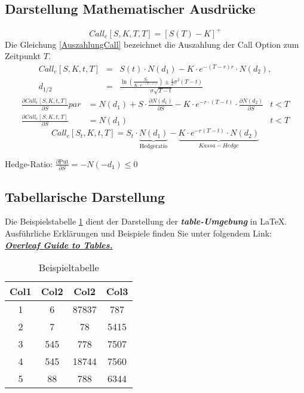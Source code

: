 \documentclass[12pt,a4paper]{article}
\begin{document}
\subsection{Darstellung Mathematischer Ausdrücke}\label{math}
\begin{equation}\label{AuszahlungCall}
Call_e[S,K,T,T]=\left[S(T)-K\right]^+
\end{equation}
Die Gleichung \eqref{AuszahlungCall} bezeichnet die Auszahlung der Call Option zum Zeitpunkt $T$.
\begin{eqnarray*}
Call_e[S,K,t,T]&=&S(t)\cdot N(d_1)-K\cdot e^{-(T-r)r}\cdot N(d_2),\\
d_{1/2}&=&\frac{\ln\left(\frac{S_t}{K\cdot e^{-(T-t)r}}\right)\pm\frac{1}{2}\sigma^2(T-t)}{\sigma\sqrt{T-t}}
\end{eqnarray*}
\begin{align}
\frac{\partial Call_e[S,K,t,T]}{\partial S}par&=N(d_1)+S\cdot\frac{\partial N(d_1)}{\partial S}-K\cdot e^{-r\cdot(T-t)}\cdot\frac{\partial N(d_2)}{\partial S}&t<T\\
\frac{\partial Call_e[S,K,t,T]}{\partial S}&=N(d_1)&t<T
\end{align}
$$Call_e[S_t,K,t,T]=S_t\cdot \underbrace{N(d_1)}_{\text{Hedgeratio}}-\underbrace{K\cdot e^{-r(T-t)}\cdot N(d_2)}_{Kassa-Hedge}$$

Hedge-Ratio: $\frac{\partial \text{Put}}{\partial S}=-N(-d_1)\leq 0$

\subsection{Tabellarische Darstellung}\label{numeric}

Die Beispielstabelle \ref{Tbsp} dient der Darstellung der \textbf{\emph{table-Umgebung}} in \LaTeX.\\
Ausführliche Erklärungen und Beispiele finden Sie unter folgendem Link:\\
\href{https://www.overleaf.com/learn/latex/tables}{\textbf{\emph {Overleaf Guide to Tables.}}}
\begin{table}[h!]
\centering
\begin{tabular}{||c c c c||} 
 \hline
 Col1 & Col2 & Col2 & Col3 \\ [0.5ex] 
 \hline\hline
 1 & 6 & 87837 & 787 \\ 
 2 & 7 & 78 & 5415 \\
 3 & 545 & 778 & 7507 \\
 4 & 545 & 18744 & 7560 \\
 5 & 88 & 788 & 6344 \\ [1ex] 
 \hline
\end{tabular}
\caption{Beispieltabelle}
\label{Tbsp}
\end{table}
\newpage
\end{document}
